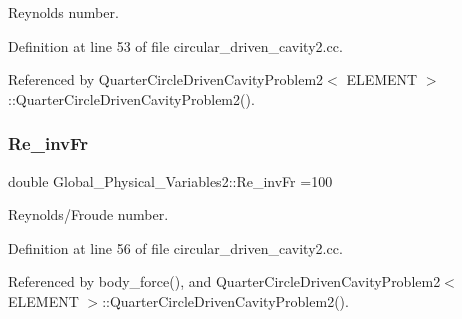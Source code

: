 Reynolds number. 



Definition at line 53 of file circular\+\_\+driven\+\_\+cavity2.\+cc.



Referenced by Quarter\+Circle\+Driven\+Cavity\+Problem2$<$ E\+L\+E\+M\+E\+N\+T $>$\+::\+Quarter\+Circle\+Driven\+Cavity\+Problem2().

\mbox{\label{namespaceGlobal__Physical__Variables2_a29c665c13064cdd6ecbb6c6ab654f743}} 
\subsubsection{\texorpdfstring{Re\+\_\+inv\+Fr}{Re\_invFr}}
{\footnotesize\ttfamily double Global\+\_\+\+Physical\+\_\+\+Variables2\+::\+Re\+\_\+inv\+Fr =100}



Reynolds/\+Froude number. 



Definition at line 56 of file circular\+\_\+driven\+\_\+cavity2.\+cc.



Referenced by body\+\_\+force(), and Quarter\+Circle\+Driven\+Cavity\+Problem2$<$ E\+L\+E\+M\+E\+N\+T $>$\+::\+Quarter\+Circle\+Driven\+Cavity\+Problem2().


